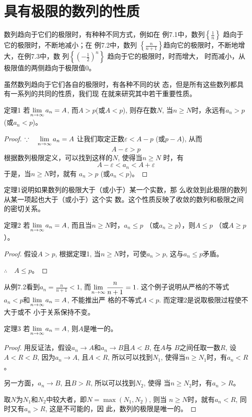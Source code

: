 \section{具有极限的数列的性质}
数列趋向于它们的极限时，有种种不同方式，例如在
例7.1中，数列$\left\{\frac{1}{n}\right\}$
趋向于它的极限时，不断地减小；在
例7.2中，数列
$\left\{\frac{n}{n+1}\right\}$趋向它的极限时，不断地增大，在例7.3中，数
列$\left\{\left(-\frac{1}{2}\right)^n\right\}$
趋向于它的极限时，时而增大，
时而减小，从极限值的两侧趋向于极限值0。

虽然数列趋向于它们各自的极限时，有各种不同的状
态，但是所有这些数列都具有一系列的共同的性质，我们现
在就来研究其中若干重要性质。

\begin{blk}{定理1}
     若$\displaystyle\lim_{n\to\infty}a_n=A$, 而$A>p$(或$A<p$), 则存在数$N$, 当$n\ge N$时，永远有$a_n>p$(或$a_n<p$)。
\end{blk}

\begin{proof}
$\because\quad \displaystyle\lim_{n\to\infty}a_n=A$
让我们取定正数$\varepsilon<A-p$ (或$p-A$), 从而
$$A-\varepsilon>p$$
根据数列极限定义，可以找到这样的$N$, 使得当$n\ge N$
时，有
$$A-\varepsilon<a_n<A+\varepsilon$$
于是，当$n\ge N$时，就有
$a_n>p$ (或$a_n<p$)。    
\end{proof}

定理1说明如果数列的极限大于（或小于）某一个实数，那
么收敛到此极限的数列从某一项起也大于（或小于）这个实
数。这个性质反映了收敛的数列和极限之间的密切关系。

\begin{blk}{定理2}
若$\displaystyle\lim_{n\to\infty}a_n=A$, 而且当$n\ge N$时，$a_n\le p$ （或$a_n\ge p$），则$A\le p$ （或$A\ge p$）。
\end{blk}

\begin{proof}
 假设$A>p$, 根据定理1, 当$n\ge N$时，可使$a_n>
p$, 这与$a_n\le p$矛盾。

$\therefore\quad A\le p$。
\end{proof}

从例7.2看到$a_n=\frac{n}{n+1}<1$, 而$\displaystyle\lim_{n\to\infty}\dfrac{n}{n+1}=1$. 这个例子说明从严格的不等式$a_n<p$和$\displaystyle\lim_{n\to\infty}a_n=A$, 不能推出严
格的不等式$A<p$. 而定理2是说取极限过程使不大于或不
小于关系保持不变。

\begin{blk}{定理3}
    若$\displaystyle\lim_{n\to\infty}a_n=A$, 则$A$是唯一的。
\end{blk}

\begin{proof}
用反证法，假设$a_n\to A$和$a_n\to B$且$A<B$, 在$A$与
$B$之间任取一数$R$, 设$A<R<B$, 因为$a_n\to A$, 且$A<R$,
所以可以找到$N_1$, 使得当$n\ge N_1$时，有$a_n<R$。

另一方面，$a_n\to B$, 且$B>R$, 所以可以找到$N_2$, 使得
当$n\ge N_2$时，有$a_n>R$。

取$N$为$N_1$和$N_2$中较大者，即$N=\max(N_1,N_2)$, 则当
$n\ge N$时，就有$a_n<R$, 同时又有$a_n>R$, 这是不可能的，因
此，数列的极限是唯一的。
\end{proof}

